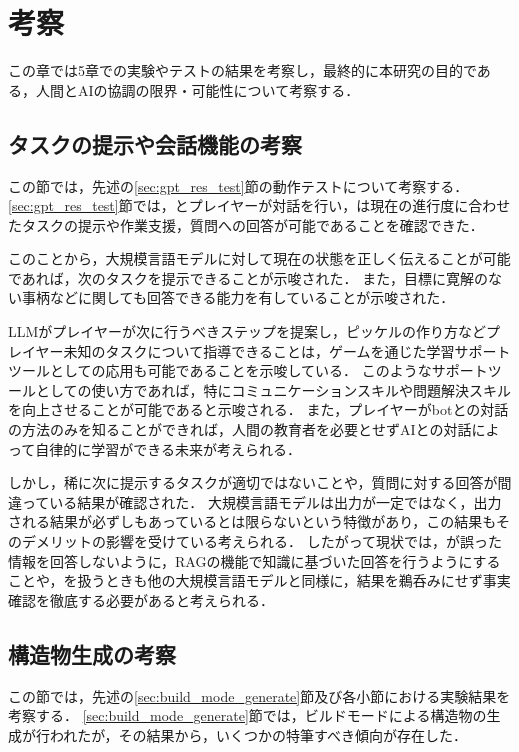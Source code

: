 \chapter{考察}
\thispagestyle{plain}   %

この章では5章での実験やテストの結果を考察し，最終的に本研究の目的である，人間とAIの協調の限界・可能性について考察する．

\section{タスクの提示や会話機能の考察}\label{sec:gpt_res_investigation}
この節では，先述の\ref{sec:gpt_res_test}節の動作テストについて考察する．
\ref{sec:gpt_res_test}節では，{\mason}とプレイヤーが対話を行い，{\mason}は現在の進行度に合わせたタスクの提示や作業支援，質問への回答が可能であることを確認できた．

このことから，大規模言語モデルに対して現在の状態を正しく伝えることが可能であれば，次のタスクを提示できることが示唆された．
また，目標に寛解のない事柄などに関しても回答できる能力を有していることが示唆された．

LLMがプレイヤーが次に行うべきステップを提案し，ピッケルの作り方などプレイヤー未知のタスクについて指導できることは，ゲームを通じた学習サポートツールとしての応用も可能であることを示唆している．
このようなサポートツールとしての使い方であれば，特にコミュニケーションスキルや問題解決スキルを向上させることが可能であると示唆される．
また，プレイヤーがbotとの対話の方法のみを知ることができれば，人間の教育者を必要とせずAIとの対話によって自律的に学習ができる未来が考えられる．

しかし，稀に次に提示するタスクが適切ではないことや，質問に対する回答が間違っている結果が確認された．
大規模言語モデルは出力が一定ではなく，出力される結果が必ずしもあっているとは限らないという特徴があり，この結果もそのデメリットの影響を受けている考えられる．
したがって現状では，{\mason}が誤った情報を回答しないように，RAGの機能で知識に基づいた回答を行うようにすることや，{\mason}を扱うときも他の大規模言語モデルと同様に，結果を鵜呑みにせず事実確認を徹底する必要があると考えられる．

\section{構造物生成の考察}\label{sec:generate_investigation}
この節では，先述の\ref{sec:build_mode_generate}節及び各小節における実験結果を考察する．
\ref{sec:build_mode_generate}節では，ビルドモードによる構造物の生成が行われたが，その結果から，いくつかの特筆すべき傾向が存在した．

